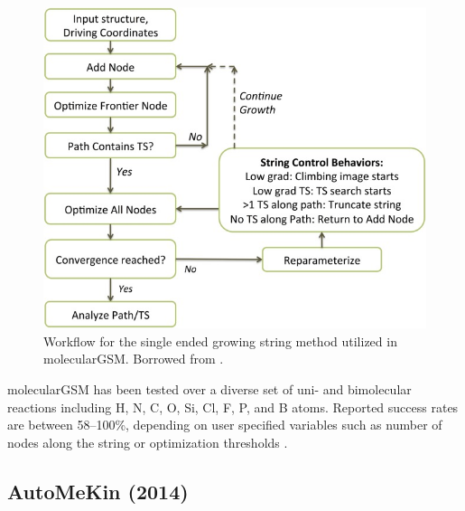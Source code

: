 \documentclass[preprint, 11pt]{elsarticle} %
\begin{document}
\begin{figure}[htbp]
    \centering
    \includegraphics[width=5in]{se-gsm}
    \caption{Workflow for the single ended growing string method utilized in molecularGSM. Borrowed from \cite{Zimmerman:2015jcc}.}
    \label{fig:se-gsm}
\end{figure}

molecularGSM has been tested over a diverse set of uni- and bimolecular reactions including H, N, C, O, Si, Cl, F, P, and B atoms.
Reported success rates are between 58--100\%, depending on user specified variables such as number of nodes along the string or optimization thresholds \cite{Zimmerman:2013jctc, Zimmerman:2013jcp, Zimmerman:2015jcc, Jafari:2017, Roessler:2018, Aldaz:2018}.



\subsection{AutoMeKin (2014)}
\end{document}
